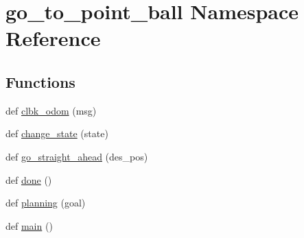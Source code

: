 \hypertarget{namespacego__to__point__ball}{}\section{go\+\_\+to\+\_\+point\+\_\+ball Namespace Reference}
\label{namespacego__to__point__ball}
\subsection*{Functions}
\begin{DoxyCompactItemize}
\item 
def \hyperlink{namespacego__to__point__ball_a8b53c165c87e66822f50ab5daebc14dc}{clbk\+\_\+odom} (msg)
\item 
def \hyperlink{namespacego__to__point__ball_ac5839fd3601d15749a1e1a28939b2c68}{change\+\_\+state} (state)
\item 
def \hyperlink{namespacego__to__point__ball_aecbf76a67251ff6a3a0840bb61e1c581}{go\+\_\+straight\+\_\+ahead} (des\+\_\+pos)
\item 
def \hyperlink{namespacego__to__point__ball_ab92c8b4240f09ff0b5d960c748ade799}{done} ()
\item 
def \hyperlink{namespacego__to__point__ball_ab0e05a6be4adc81f80b5635d9bd692d1}{planning} (goal)
\item 
def \hyperlink{namespacego__to__point__ball_a4d4c016b6bb12c612710a2d39ade3465}{main} ()
\end{DoxyCompactItemize}
